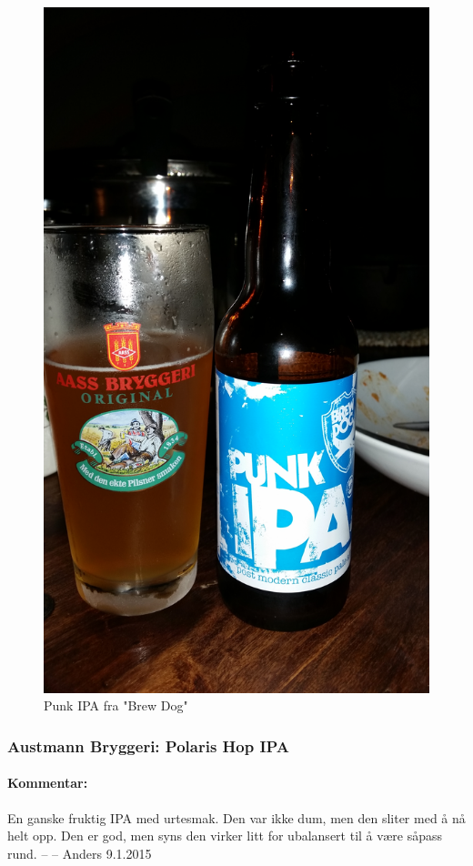 \documentclass[12pt,a4paper,oneside,norsk]{article}
\begin{document}
\begin{figure} [H]
\centering
\includegraphics[scale=0.1, angle=270]{Bilder/Ol/BrewDogPUNKIPA.jpg}
\caption{Punk IPA fra "Brew Dog"}
\end{figure}
\newpage

\subsubsection{Austmann Bryggeri: Polaris Hop IPA}
\paragraph{Kommentar:} En ganske fruktig IPA med urtesmak. Den var ikke dum, men den sliter med å nå helt opp. Den er god, men syns den virker litt for ubalansert til å være såpass rund.  
\newline
-- -- Anders 9.1.2015
\end{document}
